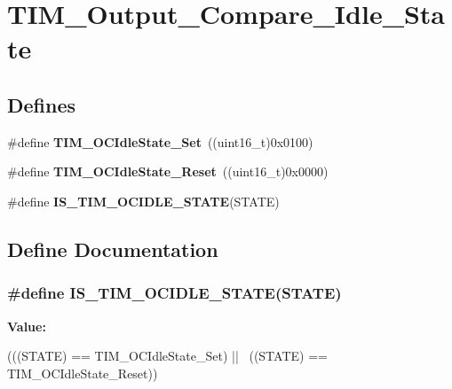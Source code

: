 \hypertarget{group__TIM__Output__Compare__Idle__State}{
\section{TIM\_\-Output\_\-Compare\_\-Idle\_\-State}
\label{group__TIM__Output__Compare__Idle__State}
}
\subsection*{Defines}
\begin{DoxyCompactItemize}
\item 
\hypertarget{group__TIM__Output__Compare__Idle__State_ga86d8f895a1ec584323f6c02c7edfad4c}{
\#define {\bfseries TIM\_\-OCIdleState\_\-Set}~((uint16\_\-t)0x0100)}
\label{group__TIM__Output__Compare__Idle__State_ga86d8f895a1ec584323f6c02c7edfad4c}

\item 
\hypertarget{group__TIM__Output__Compare__Idle__State_gace5465bc9e90ba7862b3af9e6cc9b97e}{
\#define {\bfseries TIM\_\-OCIdleState\_\-Reset}~((uint16\_\-t)0x0000)}
\label{group__TIM__Output__Compare__Idle__State_gace5465bc9e90ba7862b3af9e6cc9b97e}

\item 
\#define {\bfseries IS\_\-TIM\_\-OCIDLE\_\-STATE}(STATE)
\end{DoxyCompactItemize}


\subsection{Define Documentation}
\hypertarget{group__TIM__Output__Compare__Idle__State_ga69c62dcc15f9d39108b19b64205d689e}{
\subsubsection[{IS\_\-TIM\_\-OCIDLE\_\-STATE}]{\setlength{\rightskip}{0pt plus 5cm}\#define IS\_\-TIM\_\-OCIDLE\_\-STATE(STATE)}}
\label{group__TIM__Output__Compare__Idle__State_ga69c62dcc15f9d39108b19b64205d689e}
{\bfseries Value:}
\begin{DoxyCode}
(((STATE) == TIM_OCIdleState_Set) || \
                                    ((STATE) == TIM_OCIdleState_Reset))
\end{DoxyCode}
